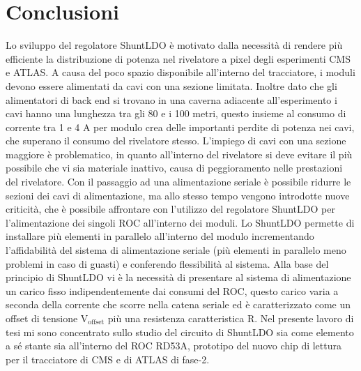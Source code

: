 \chapter{Conclusioni}


Lo sviluppo del regolatore ShuntLDO è motivato dalla necessità di rendere più efficiente la distribuzione di potenza nel rivelatore a pixel degli esperimenti CMS e ATLAS.
A causa del poco spazio disponibile all'interno del tracciatore, i moduli devono essere alimentati da cavi con una sezione limitata. Inoltre dato che gli alimentatori di back end si trovano in una caverna adiacente all'esperimento i cavi hanno una lunghezza tra gli 80 e i 100 metri, questo insieme al consumo di corrente tra 1 e 4 A per modulo crea delle importanti perdite di potenza nei cavi, che superano il consumo del rivelatore stesso. 
L'impiego di cavi con una sezione maggiore è problematico, in quanto all'interno del rivelatore si deve evitare il più possibile che vi sia materiale inattivo, causa di peggioramento nelle prestazioni del rivelatore. 
Con il passaggio ad una alimentazione seriale è possibile ridurre le sezioni dei cavi di alimentazione, ma allo stesso tempo vengono introdotte nuove criticità, che è possibile affrontare con l'utilizzo del regolatore ShuntLDO per l'alimentazione dei singoli ROC all'interno dei moduli.
Lo ShuntLDO permette di installare più elementi in parallelo all'interno del modulo incrementando  l'affidabilità del sistema di alimentazione seriale (più elementi in parallelo meno problemi in caso di guasti) e conferendo  flessibilità al sistema. 
Alla base del principio di ShuntLDO vi è la necessità di presentare al sistema di alimentazione un carico fisso indipendentemente dai consumi del ROC, questo carico varia a seconda della corrente che scorre nella catena seriale ed è caratterizzato come un offset di tensione $\mathrm{V_{offset}}$ più una resistenza caratteristica R.
Nel presente lavoro di tesi mi sono concentrato sullo studio del circuito di ShuntLDO sia come elemento a sé stante sia all'interno del ROC RD53A, prototipo del nuovo chip di lettura per il tracciatore di CMS e di ATLAS di fase-2. 

